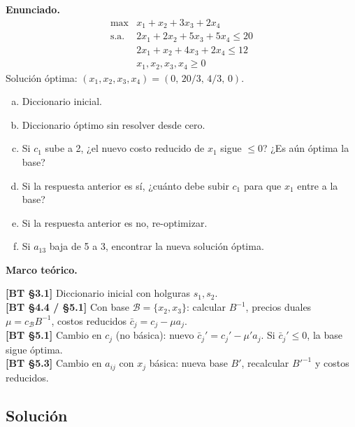 \documentclass{article}
\newenvironment{marco}{\begin{mdframed}[linecolor=black!40,backgroundcolor=gray!5]\small\textbf{Marco teórico.}\par\smallskip}{\end{mdframed}\medskip}
\begin{document}
\textbf{Enunciado.}
\[
\begin{array}{ll}
\max & x_1 + x_2 + 3x_3 + 2x_4 \\
\text{s.a.} & 2x_1 + 2x_2 + 5x_3 + 5x_4 \leq 20 \\
& 2x_1 + x_2 + 4x_3 + 2x_4 \leq 12 \\
& x_1, x_2, x_3, x_4 \geq 0
\end{array}
\]
Solución óptima: $(x_1, x_2, x_3, x_4) = (0,\, 20/3,\, 4/3,\, 0)$.
\begin{enumerate}[a)]
  \item Diccionario inicial.
  \item Diccionario óptimo sin resolver desde cero.
  \item Si $c_1$ sube a 2, ¿el nuevo costo reducido de $x_1$ sigue $\leq 0$? ¿Es aún óptima la base?
  \item Si la respuesta anterior es sí, ¿cuánto debe subir $c_1$ para que $x_1$ entre a la base?
  \item Si la respuesta anterior es no, re-optimizar.
  \item Si $a_{13}$ baja de 5 a 3, encontrar la nueva solución óptima.
\end{enumerate}

\begin{marco}
\textbf{[BT §3.1]} Diccionario inicial con holguras $s_1, s_2$. \\[2pt]
\textbf{[BT §4.4 / §5.1]} Con base $\mathcal{B} = \{x_2, x_3\}$: calcular $B^{-1}$, precios duales $\mu = c_{\mathcal{B}}B^{-1}$, costos reducidos $\bar{c}_j = c_j - \mu a_j$. \\[2pt]
\textbf{[BT §5.1]} Cambio en $c_j$ (no básica): nuevo $\bar{c}_j' = c_j' - \mu' a_j$. Si $\bar{c}_j' \leq 0$, la base sigue óptima. \\[2pt]
\textbf{[BT §5.3]} Cambio en $a_{ij}$ con $x_j$ básica: nueva base $B'$, recalcular $B'^{-1}$ y costos reducidos.
\end{marco}

\subsection*{Solución}
\end{document}

